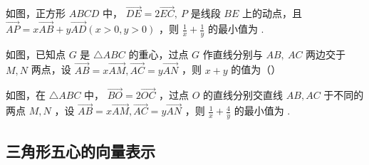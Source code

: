 \begin{figure} [H]
    \centering
    \resizebox{0.15\textwidth}{!}{}
\end{figure}

\begin{example}如图，正方形 $A B C D$ 中， $\overrightarrow{D E}=2 \overrightarrow{E C}, ~ P$ 是线段 $B E$ 上的动点，且 $\overrightarrow{A P}=x \overrightarrow{A B}+y \overrightarrow{A D}(x>0, y>0)$ ，则 $\frac{1}{x}+\frac{1}{y}$ 的最小值为 \underline{\qquad}.
\end{example}

\begin{figure} [H]
    \centering
    \resizebox{0.15\textwidth}{!}{}
\end{figure}

\begin{example}
    如图，已知点 $G$ 是 $\triangle A B C$ 的重心，过点 $G$ 作直线分别与 $A B, ~ A C$ 两边交于 $M, N$ 两点，设 $\overrightarrow{A B}=x \overrightarrow{A M}, \overrightarrow{A C}=y \overrightarrow{A N}$ ，则 $x+y$ 的值为（\qquad）
\end{example}

\begin{figure} [H]
    \centering
    \resizebox{0.15\textwidth}{!}{}
\end{figure}

\begin{example}
    如图，在 $\triangle A B C$ 中， $\overrightarrow{B O}=2 \overrightarrow{O C}$ ，过点 $O$ 的直线分别交直线 $A B, A C$ 于不同的两点 $M, N$ ，设 $\overrightarrow{A B}=x \overrightarrow{A M}, \overrightarrow{A C}=y \overrightarrow{A N}$ ，则 $\frac{1}{x}+\frac{4}{y}$ 的最小值为 \underline{\qquad}.
\end{example}

\begin{figure} [H]
    \centering
    \resizebox{0.2\textwidth}{!}{}
\end{figure}

\subsection{三角形五心的向量表示}

